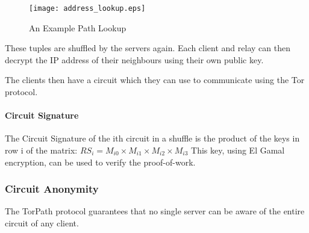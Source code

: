 \begin{figure}
\centering
\texttt{[image: address\_lookup.eps]}
\caption{An Example Path Lookup}
\end{figure}

These tuples are shuffled by the servers again. Each client and relay can then 
decrypt the IP address of their neighbours using their own public key.

The clients then have a circuit which they can use to communicate using the Tor 
protocol.

\paragraph{Circuit Signature}
The Circuit Signature of the ith circuit in a shuffle is the product of the keys
in row i of the matrix:
$RS_i = M_{i0} \times M_{i1} \times M_{i2} \times M_{i3}$
This key, using El Gamal encryption, can be used to verify the proof-of-work.

\subsubsection{Circuit Anonymity} 
The TorPath protocol guarantees that no single server can be aware of the entire
circuit of any client. 






